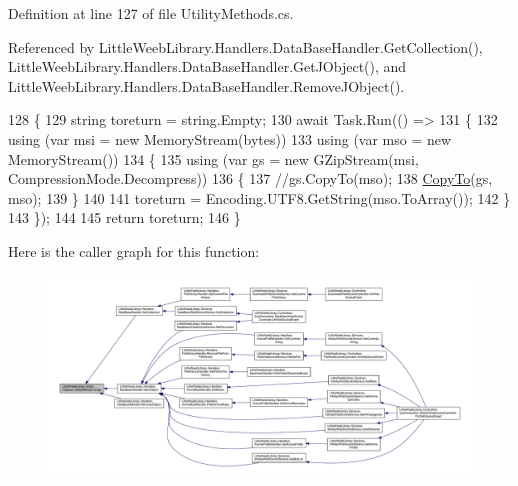 Definition at line 127 of file Utility\+Methods.\+cs.



Referenced by Little\+Weeb\+Library.\+Handlers.\+Data\+Base\+Handler.\+Get\+Collection(), Little\+Weeb\+Library.\+Handlers.\+Data\+Base\+Handler.\+Get\+J\+Object(), and Little\+Weeb\+Library.\+Handlers.\+Data\+Base\+Handler.\+Remove\+J\+Object().


\begin{DoxyCode}
128         \{
129             \textcolor{keywordtype}{string} toreturn = \textcolor{keywordtype}{string}.Empty;
130             await Task.Run(() =>
131             \{
132                 \textcolor{keyword}{using} (var msi = \textcolor{keyword}{new} MemoryStream(bytes))
133                 \textcolor{keyword}{using} (var mso = \textcolor{keyword}{new} MemoryStream())
134                 \{
135                     \textcolor{keyword}{using} (var gs = \textcolor{keyword}{new} GZipStream(msi, CompressionMode.Decompress))
136                     \{
137                         \textcolor{comment}{//gs.CopyTo(mso);}
138                         \mbox{\hyperlink{class_little_weeb_library_1_1_static_classes_1_1_utility_methods_a4a514b7e55cf2285f4f16d778164695d}{CopyTo}}(gs, mso);
139                     \}
140 
141                     toreturn = Encoding.UTF8.GetString(mso.ToArray());
142                 \}
143             \});
144 
145             \textcolor{keywordflow}{return} toreturn;
146         \}
\end{DoxyCode}
Here is the caller graph for this function\+:\nopagebreak
\begin{figure}[H]
\begin{center}
\leavevmode
\includegraphics[width=350pt]{class_little_weeb_library_1_1_static_classes_1_1_utility_methods_a0a86ee01a3bf201bd9cc9b2552e54976_icgraph}
\end{center}
\end{figure}
\mbox{\label{class_little_weeb_library_1_1_static_classes_1_1_utility_methods_a6542a3a6ea0aed6b4d78bb44a4a7d9d7}} 

